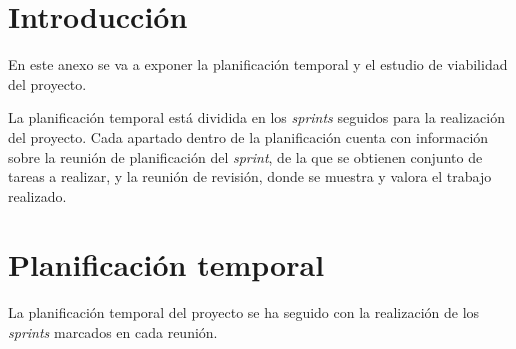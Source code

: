
\section{Introducción}
En este anexo se va a exponer la planificación temporal y el estudio de viabilidad del proyecto.

La planificación temporal está dividida en los \textit{sprints} seguidos para la realización del proyecto.
Cada apartado dentro de la planificación cuenta con información sobre la reunión de planificación del \textit{sprint}, de la que se obtienen conjunto de tareas a realizar, y la reunión de revisión, donde se muestra y valora el trabajo realizado.

\section{Planificación temporal}
La planificación temporal del proyecto se ha seguido con la realización de los \textit{sprints} marcados en cada reunión.

